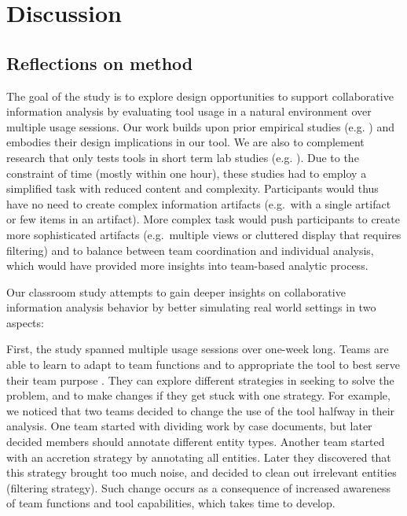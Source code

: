 \section{Discussion}\label{discussion}

\subsection{Reflections on method}\label{reflections-on-method}

The goal of the study is to explore design opportunities to support
collaborative information analysis by evaluating tool usage in a natural
environment over multiple usage sessions. Our work builds upon prior
empirical studies (e.g.
\autocites{Carroll2013}{Borge2012}{Kang2011}{Chin2009}) and embodies
their design implications in our tool. We are also to complement
research that only tests tools in short term lab studies (e.g.
\autocites{Convertino2011}{Goyal2016}{Hajizadeh2013}). Due to the
constraint of time (mostly within one hour), these studies had to employ
a simplified task with reduced content and complexity. Participants
would thus have no need to create complex information artifacts
(e.g.~with a single artifact or few items in an artifact). More complex
task would push participants to create more sophisticated artifacts
(e.g.~multiple views or cluttered display that requires filtering) and
to balance between team coordination and individual analysis, which
would have provided more insights into team-based analytic process.

Our classroom study attempts to gain deeper insights on collaborative
information analysis behavior by better simulating real world settings
in two aspects:

First, the study spanned multiple usage sessions over one-week long.
Teams are able to learn to adapt to team functions and to appropriate
the tool to best serve their team purpose \autocite{Stahl2006}. They can
explore different strategies in seeking to solve the problem, and to
make changes if they get stuck with one strategy. For example, we
noticed that two teams decided to change the use of the tool halfway in
their analysis. One team started with dividing work by case documents,
but later decided members should annotate different entity types.
Another team started with an accretion strategy by annotating all
entities. Later they discovered that this strategy brought too much
noise, and decided to clean out irrelevant entities (filtering
strategy). Such change occurs as a consequence of increased awareness of
team functions and tool capabilities, which takes time to develop.

